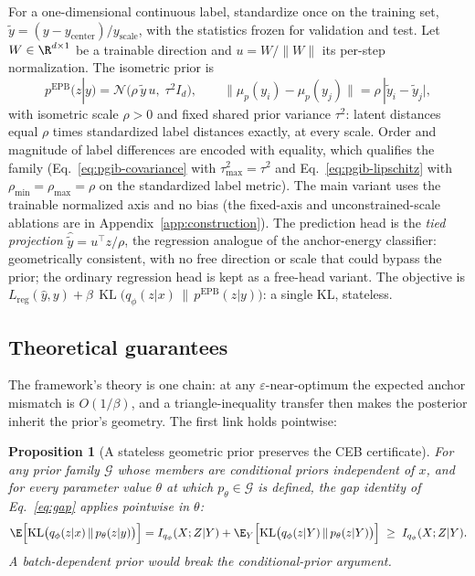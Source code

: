 \documentclass{article} %
\theoremstyle{plain}
\newtheorem{proposition}{Proposition}[section]
\theoremstyle{remark}
\renewcommand{\KL}{\operatorname{KL}}
\begin{document}
For a one-dimensional continuous label, standardize once on the training set,
$\tilde y = (y - y_{\mathrm{center}})/y_{\mathrm{scale}}$, with the statistics frozen
for validation and test. Let $W \in \R^{d \times 1}$ be a trainable direction and
$u = W/\|W\|$ its per-step normalization. The isometric prior is
\begin{equation}
p^{\mathrm{EPB}}(z|y)
= \mathcal{N}\bigl(\rho\, \tilde y\, u,\; \tau^2 I_d\bigr),
\qquad
\| \mu_p(y_i) - \mu_p(y_j) \| = \rho\, |\tilde y_i - \tilde y_j| ,
\label{eq:epb-prior}
\end{equation}
with isometric scale $\rho > 0$ and fixed shared prior variance $\tau^2$: latent
distances equal $\rho$ times standardized label distances exactly, at every scale.
Order and magnitude of label differences are encoded with equality, which qualifies
the family (Eq.~\eqref{eq:pgib-covariance} with $\tau^2_{\max} = \tau^2$ and
Eq.~\eqref{eq:pgib-lipschitz} with $\rho_{\min} = \rho_{\max} = \rho$ on the
standardized label metric). The main variant uses the trainable normalized axis and no
bias (the fixed-axis and unconstrained-scale ablations are in
Appendix~\ref{app:construction}). The prediction head is the \emph{tied projection}
$\hat{\tilde y} = u^{\top} z / \rho$, the regression analogue of the anchor-energy
classifier: geometrically consistent, with no free direction or scale that could
bypass the prior; the ordinary regression head is kept as a free-head variant. The
objective is $L_{\mathrm{reg}}(\hat y, y) + \beta\,\KL\bigl(q_\phi(z|x)\,\|\,p^{\mathrm{EPB}}(z|y)\bigr)$:
a single KL, stateless.

\subsection{Theoretical guarantees}
\label{sec:guarantees}

The framework's theory is one chain: at any $\varepsilon$-near-optimum the expected
anchor mismatch is $O(1/\beta)$, and a triangle-inequality transfer then makes the
posterior inherit the prior's geometry. The first link holds pointwise:

\begin{proposition}[A stateless geometric prior preserves the CEB certificate]
\label{prop:opb-certificate}
For any prior family $\mathcal{G}$ whose members are conditional priors independent of
$x$, and for every parameter value $\theta$ at which $p_\theta \in \mathcal{G}$ is
defined, the gap identity of Eq.~\eqref{eq:gap} applies pointwise in $\theta$:
\begin{equation}
\E\Bigl[ \KL\bigl(q_\phi(z|x) \,\|\, p_\theta(z|y)\bigr) \Bigr]
= I_{q_\phi}(X;Z|Y)
+ \E_Y\Bigl[ \KL\bigl(q_\phi(z|Y) \,\|\, p_\theta(z|Y)\bigr) \Bigr]
\;\ge\; I_{q_\phi}(X;Z|Y) .
\label{eq:opb-certificate}
\end{equation}
A batch-dependent prior would break the conditional-prior argument.
\end{proposition}
\end{document}
